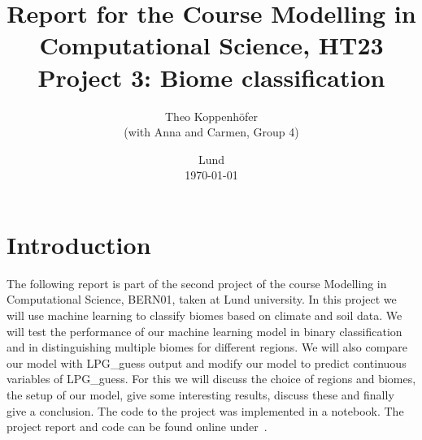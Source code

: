 





\title{ Report for the Course Modelling in Computational Science, HT23 \\[1ex]
	  \large Project 3: Biome classification}
\author{Theo Koppenhöfer \\[1ex] (with Anna and Carmen, Group 4)}
\date{Lund \\[1ex] \today}



\graphicspath{{../Project3RandomForestML/plots/}}




\usepackage{pythonhighlight}



\maketitle

\section{Introduction}
The following report is part of the second project of the course Modelling in Computational Science, BERN01, taken at Lund university.
In this project we will use machine learning to classify biomes based on climate and soil data. We will test the performance of our machine
learning model in binary classification and in distinguishing multiple biomes for different regions. We will also compare our model with LPG\_guess output
and modify our model to predict continuous variables of LPG\_guess.
For this we will discuss the choice of regions and biomes, the setup of our model, give some interesting results, discuss these and finally give a conclusion.
The code to the project was implemented in a  notebook.
The project report and code can be found online under~\cite{Repository}.


